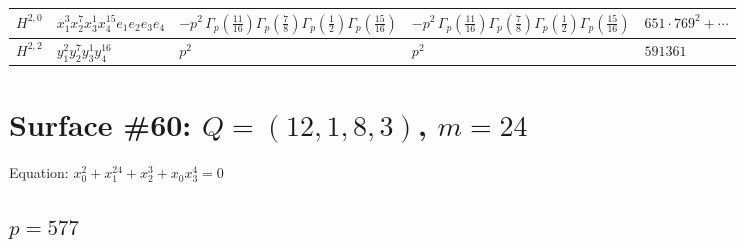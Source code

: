 \documentclass[11pt]{article}
\begin{document}
\begin{table}[ht]
{\begin{tabular}{@{}lllll@{}}
\midrule
$H^{2,0}$ & $x_{1}^{3} x_{2}^{7} x_{3}^{1} x_{4}^{15}  e_{1} e_{2} e_{3} e_{4}$ & $- p^{2} \, \Gamma_p \left( \frac{11}{16} \right) \Gamma_p \left( \frac{7}{8} \right) \Gamma_p \left( \frac{1}{2} \right) \Gamma_p \left( \frac{15}{16} \right)$ & $- p^{2} \, \Gamma_p \left( \frac{11}{16} \right) \Gamma_p \left( \frac{7}{8} \right) \Gamma_p \left( \frac{1}{2} \right) \Gamma_p \left( \frac{15}{16} \right)$ & $651{\cdot}769^{2}{+}\cdots$ \\
\midrule
$H^{2,2}$ & $y_{1}^{2} y_{2}^{7} y_{3}^{1} y_{4}^{16}$ & $p^{2} \,$ & $p^{2} \,$ & $591361$ \\
\bottomrule
\end{tabular}
}
\renewcommand{\arraystretch}{1.0}
\end{table}

\newpage

\section*{Surface \#60: $Q=(12, 1, 8, 3)$, $m=24$}

Equation: $x_0^{2} + x_1^{24} + x_2^{3} + x_0 x_3^{4} = 0$

\subsection*{$p = 577$}
\end{document}

